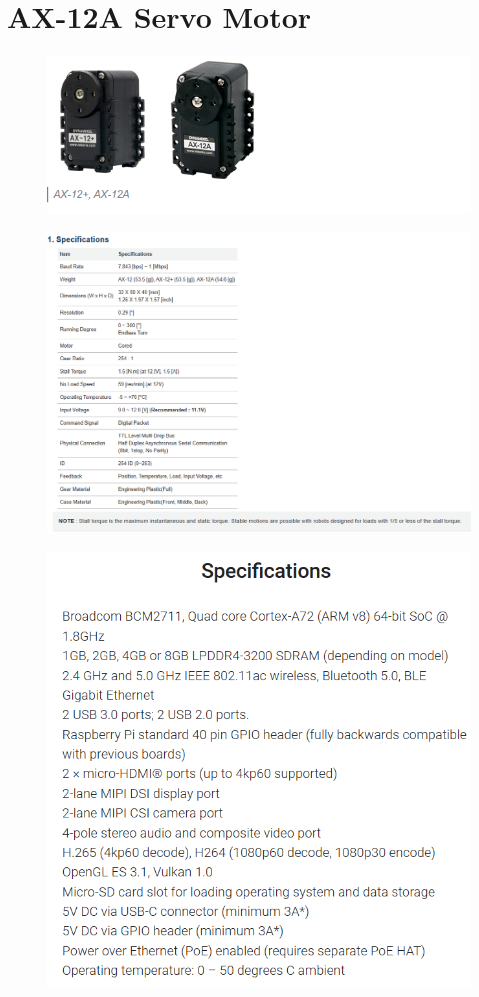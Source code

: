 \section*{AX-12A Servo Motor}

\begin{figure}[H]
	\centering
	\includegraphics[width=1\textwidth]{Figures/Appendecis/ax-12a-1}
\end{figure}

\begin{figure}[H]
	\centering
	\includegraphics[width=1\textwidth]{Figures/Appendecis/ax-12a-2}
\end{figure}

\begin{figure}[H]
	\centering
	\includegraphics[width=1\textwidth]{Figures/Appendecis/raspi-specs}
\end{figure}